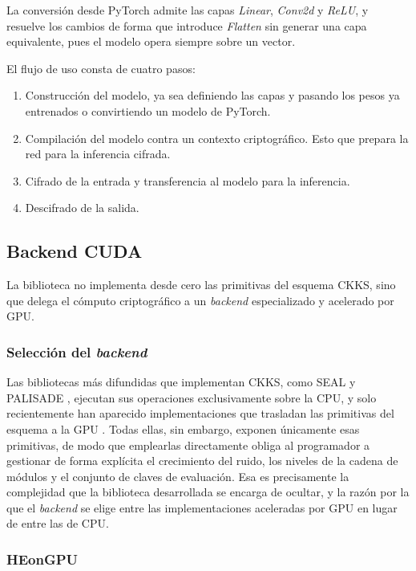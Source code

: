 La conversión desde PyTorch admite las capas \textit{Linear}, \textit{Conv2d} y \textit{ReLU}, y resuelve los cambios de forma que introduce \textit{Flatten} sin generar una capa equivalente, pues el modelo opera siempre sobre un vector.

El flujo de uso consta de cuatro pasos:

\begin{enumerate}
    \item Construcción del modelo, ya sea definiendo las capas y pasando los pesos ya entrenados o convirtiendo un modelo de PyTorch.
    \item Compilación del modelo contra un contexto criptográfico. Esto que prepara la red para la inferencia cifrada.
    \item Cifrado de la entrada y transferencia al modelo para la inferencia.
    \item Descifrado de la salida.
\end{enumerate}

\subsection{Backend CUDA}\label{sec:metodo_backend}

La biblioteca no implementa desde cero las primitivas del esquema CKKS, sino que delega el cómputo criptográfico a un \textit{backend} especializado y acelerado por GPU.

\subsubsection{Selección del \textit{backend}}

Las bibliotecas más difundidas que implementan CKKS, como SEAL \cite{SEAL} y PALISADE \cite{PALISADE}, ejecutan sus operaciones exclusivamente sobre la CPU, y solo recientemente han aparecido implementaciones que trasladan las primitivas del esquema a la GPU \cite{Turkoglu22, FIDESlib, HEonGPU}. Todas ellas, sin embargo, exponen únicamente esas primitivas, de modo que emplearlas directamente obliga al programador a gestionar de forma explícita el crecimiento del ruido, los niveles de la cadena de módulos y el conjunto de claves de evaluación. Esa es precisamente la complejidad que la biblioteca desarrollada se encarga de ocultar, y la razón por la que el \textit{backend} se elige entre las implementaciones aceleradas por GPU en lugar de entre las de CPU.

\subsubsection{HEonGPU}

